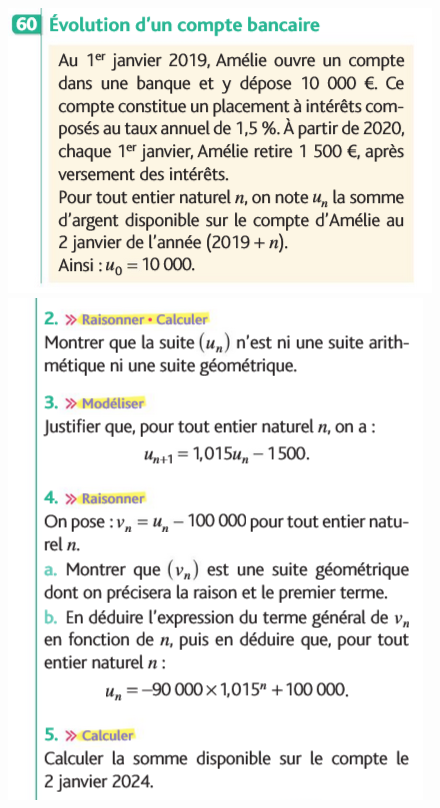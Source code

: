 \documentclass{article}
\begin{document}
\begin{center}
\begin{minipage}{0.45\textwidth}
\end{minipage}
\hfill\vline\hfill
\begin{minipage}{0.45\textwidth}
\includegraphics[width=\textwidth]{Exercice_2a.png}    
\includegraphics[width=\textwidth]{Exercice_2b.png}
\end{minipage}    
    
\end{center}
\end{document}
